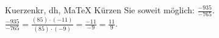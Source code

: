 \begin{MAufgabe}{Kuerzen}{kr, dh, MaTeX}
K\"urzen Sie soweit m\"oglich: $\frac{-935}{-765}$.\\ 
\ifLsg\MLoesung
\quad $\frac{-935}{-765}=\frac{(85)\cdot(-11)}{(85)\cdot(-9)}=\frac{-11}{-9}=\frac{11}{9}$.\else\relax\fi
 \end{MAufgabe}
